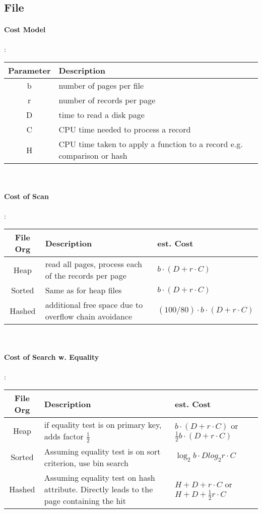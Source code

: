 \documentclass[a4paper]{article}
\begin{document}
\begin{twocolumn}
\subsection{File}
\paragraph{Cost Model}: \\
\begin{tabular}{|c|p{6cm}|} \hline
	Parameter & Description \\ \hline
	b & number of pages per file \\ \hline
	r & number of records per page \\ \hline
	D & time to read a disk page \\ \hline
	C & CPU time needed to process a record \\ \hline
	H & CPU time taken to apply a function to a record e.g. comparison or hash \\ \hline
\end{tabular} \\

\paragraph{Cost of Scan} :
\begin{tabular}{|c|p{3cm}|p{3cm}|} \hline
	File Org & Description & est. Cost \\ \hline
	Heap & read all pages, process each of the records per page & $b \cdot (D + r \cdot C)$ \\ \hline
	Sorted & Same as for heap files & $b \cdot (D + r \cdot C)$ \\ \hline
	Hashed & additional free space due to overflow chain avoidance & $ (100/80) \cdot b \cdot (D + r \cdot C)$ \\ \hline
\end{tabular} \\


\paragraph{Cost of Search w. Equality}: \\ 
\begin{tabular}{|c|p{3cm}|p{3cm}|} \hline
	File Org & Description & est. Cost \\ \hline
	Heap & if equality test is on primary key, adds factor $\frac{1}{2}$ & $b \cdot (D + r \cdot C)$ or  $ \frac{1}{2}b \cdot (D + r \cdot C)$ \\ \hline
	Sorted & Assuming equality test is on sort criterion, use bin search & $\log_2 b \cdot D  log_2 r \cdot C$ \\ \hline
	Hashed & Assuming equality test on hash attribute. Directly leads to the page containing the hit & $ H + D + r \cdot C$ or  $ H + D + \frac{1}{2} r \cdot C$ \\ \hline
\end{tabular} \\


\end{twocolumn}
\end{document}

